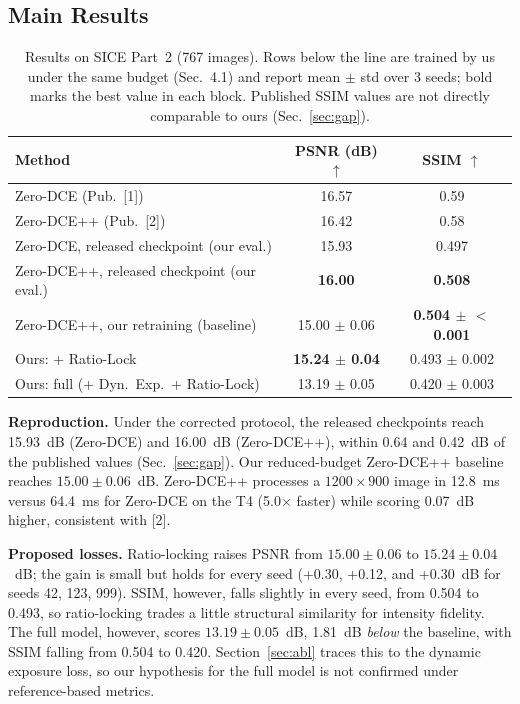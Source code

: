 \documentclass[11pt, letterpaper]{article}
\begin{document}
\subsection{Main Results}

\begin{table}[h]
\centering
\begin{tabular}{lcc}
\toprule
\textbf{Method} & \textbf{PSNR (dB)} $\uparrow$ & \textbf{SSIM} $\uparrow$ \\
\midrule
Zero-DCE (Pub.\ [1]) & 16.57 & 0.59 \\
Zero-DCE++ (Pub.\ [2]) & 16.42 & 0.58 \\
Zero-DCE, released checkpoint (our eval.) & 15.93 & 0.497 \\
Zero-DCE++, released checkpoint (our eval.) & \textbf{16.00} & \textbf{0.508} \\
\midrule
Zero-DCE++, our retraining (baseline) & 15.00 $\pm$ 0.06 & \textbf{0.504 $\pm$ $<$0.001} \\
Ours: + Ratio-Lock & \textbf{15.24 $\pm$ 0.04} & 0.493 $\pm$ 0.002 \\
Ours: full (+ Dyn.\ Exp.\ + Ratio-Lock) & 13.19 $\pm$ 0.05 & 0.420 $\pm$ 0.003 \\
\bottomrule
\end{tabular}
\caption{Results on SICE Part~2 (767 images). Rows below the line are trained by us
under the same budget (Sec.~4.1) and report mean $\pm$ std over 3 seeds; bold marks
the best value in each block. Published SSIM values are not directly comparable to
ours (Sec.~\ref{sec:gap}).}
\label{tab:main}
\end{table}

\textbf{Reproduction.} Under the corrected protocol, the released checkpoints
reach 15.93~dB (Zero-DCE) and 16.00~dB (Zero-DCE++), within 0.64 and 0.42~dB of the
published values (Sec.~\ref{sec:gap}). Our reduced-budget Zero-DCE++ baseline
reaches $15.00 \pm 0.06$~dB. Zero-DCE++ processes a $1200\times900$ image in
12.8~ms versus 64.4~ms for Zero-DCE on the T4 (5.0$\times$ faster) while scoring
0.07~dB higher, consistent with [2].

\textbf{Proposed losses.} Ratio-locking raises PSNR from $15.00 \pm 0.06$ to
$15.24 \pm 0.04$~dB; the gain is small but holds for every seed (+0.30, +0.12,
and +0.30~dB for seeds 42, 123, 999). SSIM, however, falls slightly in every seed,
from 0.504 to 0.493, so ratio-locking trades a little structural similarity for
intensity fidelity. The full model, however,
scores $13.19 \pm 0.05$~dB, 1.81~dB \emph{below} the baseline, with SSIM falling
from 0.504 to 0.420. Section~\ref{sec:abl} traces this to the dynamic exposure
loss, so our hypothesis for the full model is not confirmed under reference-based
metrics.
\end{document}
